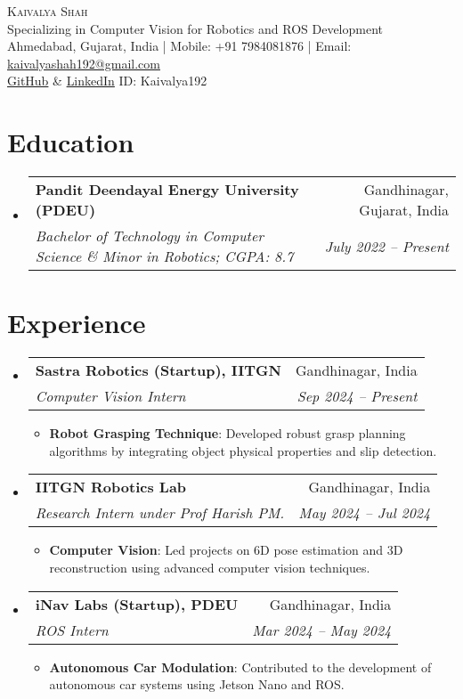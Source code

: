 \documentclass[letterpaper,11pt]{article}
\makeatletter
\newcommand{\resumeItem}[2]{
  \item\small{
    \textbf{#1}{: #2 \vspace{-2pt}}
  }
}
\newcommand{\resumeSubheading}[4]{
  \vspace{-1pt}\item
    \begin{tabular*}{0.97\textwidth}{l@{\extracolsep{\fill}}r}
      \textbf{#1} & #2 \\
      \textit{\small#3} & \textit{\small #4} \\
    \end{tabular*}\vspace{-5pt}
}
\newcommand{\resumeSubHeadingListStart}{\begin{itemize}[leftmargin=*]}
\newcommand{\resumeSubHeadingListEnd}{\end{itemize}}
\newcommand{\resumeItemListStart}{\begin{itemize}}
\newcommand{\resumeItemListEnd}{\end{itemize}\vspace{-5pt}}
\makeatother
\begin{document}
\begin{center}
  {\Huge \scshape Kaivalya Shah} \\ \vspace{1pt}
  Specializing in Computer Vision for Robotics and ROS Development \\ \vspace{1pt}
  \small Ahmedabad, Gujarat, India | Mobile: +91 7984081876 | Email: \href{mailto:kaivalyashah192@gmail.com}{kaivalyashah192@gmail.com}  \\ \vspace{1pt}
  \small\href{https://github.com/Kaivalya192}{GitHub} \& \href{https://www.linkedin.com/in/kaivalya192/}{LinkedIn} ID: Kaivalya192
\end{center}

\section{Education}
\resumeSubHeadingListStart
  \resumeSubheading
    {Pandit Deendayal Energy University (PDEU)}{Gandhinagar, Gujarat, India}
    {Bachelor of Technology in Computer Science \& Minor in Robotics; CGPA: 8.7}{July 2022 -- Present}
\resumeSubHeadingListEnd

\section{Experience}
\resumeSubHeadingListStart
  \resumeSubheading
    {Sastra Robotics (Startup), IITGN}{Gandhinagar, India}
    {Computer Vision Intern}{Sep 2024 -- Present}
    \resumeItemListStart
      \resumeItem{Robot Grasping Technique}
        {Developed robust grasp planning algorithms by integrating object physical properties and slip detection.}
    \resumeItemListEnd

  \resumeSubheading
    {IITGN Robotics Lab}{Gandhinagar, India}
    {Research Intern under Prof Harish PM.}{May 2024 -- Jul 2024}
    \resumeItemListStart
      \resumeItem{Computer Vision}
        {Led projects on 6D pose estimation and 3D reconstruction using advanced computer vision techniques.}
    \resumeItemListEnd

  \resumeSubheading
    {iNav Labs (Startup), PDEU}{Gandhinagar, India}
    {ROS Intern}{Mar 2024 -- May 2024}
    \resumeItemListStart
      \resumeItem{Autonomous Car Modulation}
        {Contributed to the development of autonomous car systems using Jetson Nano and ROS.}
    \resumeItemListEnd
\resumeSubHeadingListEnd
\end{document}
